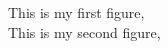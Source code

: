 \documentclass{article}
\begin{document}

This is my first figure, \\
 

This is my second figure, \\

\end{document}

